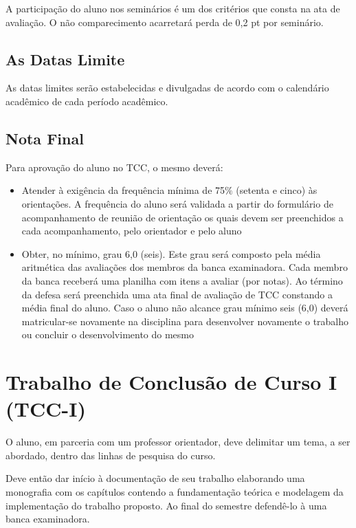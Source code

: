 A participa\c{c}\~{a}o do aluno nos semin\'{a}rios \'{e} um dos crit\'{e}rios que consta na ata de avalia\c{c}\~{a}o. O n\~{a}o comparecimento acarretar\'{a} perda de 0,2 pt por semin\'{a}rio.


\subsection{As Datas Limite}

As datas limites ser\~{a}o estabelecidas e divulgadas de acordo com o calend\'{a}rio acad\^{e}mico de cada per\'{i}odo acad\^{e}mico.


\subsection{Nota Final}

Para aprova\c{c}\~{a}o do aluno no TCC, o mesmo dever\'{a}:

	\begin{itemize}
		\item Atender \`{a} exig\^{e}ncia da frequ\^{e}ncia m\'{i}nima de 75$\%$ (setenta e cinco) \`{a}s orienta\c{c}\~{o}es. 
		A frequ\^{e}ncia do aluno ser\'{a} validada a partir do formul\'{a}rio de acompanhamento de reuni\~{a}o de orienta\c{c}\~{a}o os quais devem ser preenchidos a cada acompanhamento, 			pelo orientador e pelo aluno

		\item Obter, no m\'{i}nimo, grau 6,0 (seis). Este grau ser\'{a} composto pela m\'{e}dia aritm\'{e}tica das avalia\c{c}\~{o}es dos membros da banca examinadora. Cada membro da banca 			receber\'{a} uma planilha com itens a avaliar (por notas). Ao t\'{e}rmino da defesa ser\'{a} preenchida uma ata final de avalia\c{c}\~{a}o de TCC constando a m\'{e}dia final do aluno.
		Caso o aluno n\~{a}o alcance grau m\'{i}nimo seis (6,0) dever\'{a} matricular-se novamente na disciplina para desenvolver novamente o trabalho ou concluir o 			desenvolvimento do mesmo
	\end{itemize}


\section{Trabalho de Conclus\~{a}o de Curso I (TCC-I)}

O aluno, em parceria com um professor orientador, deve delimitar um tema, a ser abordado, dentro das linhas de pesquisa do curso.

Deve ent\~{a}o dar in\'{i}cio \`{a} documenta\c{c}\~{a}o de seu trabalho elaborando uma monografia com os cap\'{i}tulos contendo a fundamenta\c{c}\~{a}o te\'{o}rica e modelagem da implementa\c{c}\~{a}o do trabalho proposto. Ao final do semestre defend\^{e}-lo \`{a} uma banca examinadora.


